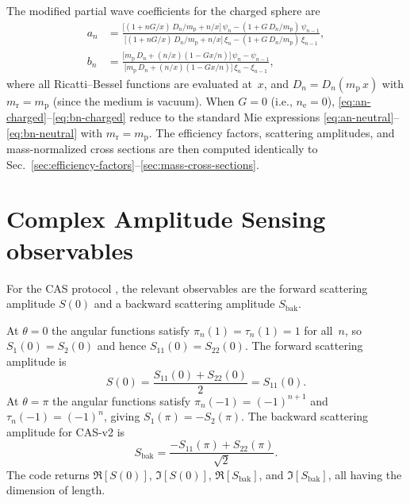 \documentclass[a4paper,11pt]{article}
\begin{document}
The modified partial wave coefficients for the charged sphere are
\begin{align}
  a_n &= \frac{
    \bigl[(1 + nG/x)\, D_n/m_\mathrm{p} + n/x\bigr]\,\psi_n
    - (1 + G\, D_n/m_\mathrm{p})\,\psi_{n-1}
  }{
    \bigl[(1 + nG/x)\, D_n/m_\mathrm{p} + n/x\bigr]\,\xi_n
    - (1 + G\, D_n/m_\mathrm{p})\,\xi_{n-1}
  },
  \label{eq:an-charged} \\[6pt]
  b_n &= \frac{
    \bigl[m_\mathrm{p}\, D_n + (n/x)(1 - Gx/n)\bigr]\,\psi_n - \psi_{n-1}
  }{
    \bigl[m_\mathrm{p}\, D_n + (n/x)(1 - Gx/n)\bigr]\,\xi_n - \xi_{n-1}
  },
  \label{eq:bn-charged}
\end{align}
where all Ricatti--Bessel functions are evaluated at~$x$, and
$D_n = D_n(m_\mathrm{p}\, x)$ with $m_\mathrm{r} = m_\mathrm{p}$ (since the
medium is vacuum).  When $G = 0$ (i.e., $n_\mathrm{e} = 0$),
\eqref{eq:an-charged}--\eqref{eq:bn-charged} reduce to the standard Mie
expressions \eqref{eq:an-neutral}--\eqref{eq:bn-neutral} with
$m_\mathrm{r} = m_\mathrm{p}$.  The efficiency factors, scattering amplitudes,
and mass-normalized cross sections are then computed identically to
Sec.~\ref{sec:efficiency-factors}--\ref{sec:mass-cross-sections}.


\section{Complex Amplitude Sensing observables}
\label{sec:cas}

For the CAS protocol \cite{moteki2021,moteki2024}, the relevant observables
are the forward scattering amplitude $S(0)$ and a backward scattering
amplitude $S_\mathrm{bak}$.

At $\theta = 0$ the angular functions satisfy $\pi_n(1) = \tau_n(1) = 1$ for
all~$n$, so $S_1(0) = S_2(0)$ and hence $S_{11}(0) = S_{22}(0)$.  The forward
scattering amplitude is
\begin{equation}
  S(0) = \frac{S_{11}(0) + S_{22}(0)}{2} = S_{11}(0).
  \label{eq:s-fwd}
\end{equation}
At $\theta = \pi$ the angular functions satisfy $\pi_n(-1) = (-1)^{n+1}$ and
$\tau_n(-1) = (-1)^n$, giving $S_1(\pi) = -S_2(\pi)$.  The backward
scattering amplitude for CAS-v2 is
\begin{equation}
  S_\mathrm{bak} = \frac{-S_{11}(\pi) + S_{22}(\pi)}{\sqrt{2}}.
  \label{eq:s-bak}
\end{equation}
The code returns $\Re[S(0)]$, $\Im[S(0)]$, $\Re[S_\mathrm{bak}]$, and
$\Im[S_\mathrm{bak}]$, all having the dimension of length.
\end{document}
